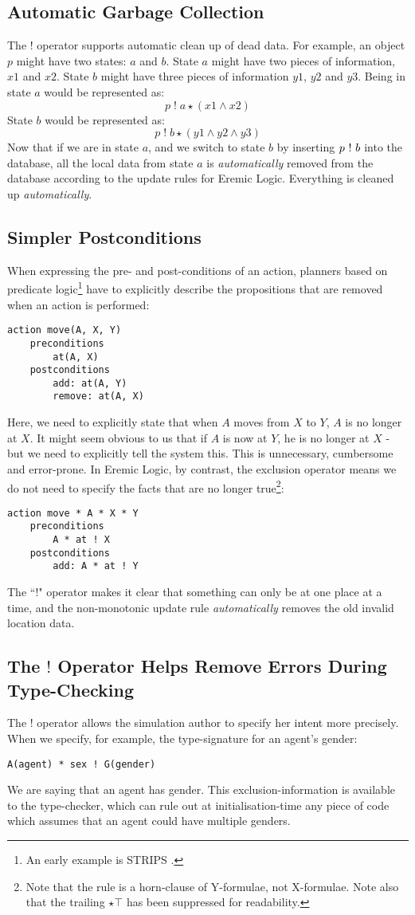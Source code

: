 \subsection{Automatic Garbage Collection}
The $!$ operator supports automatic clean up of dead data.
For example, an object $p$ might have two states: $a$ and $b$. State $a$ might have two pieces of information, $x1$ and $x2$. State $b$ might have three pieces of information $y1$, $y2$ and $y3$. Being in state $a$ would be represented as:
\[p \; ! \; a \star  (x1 \land x2)\]
State $b$ would be represented as:
\[p \; ! \; b \star (y1 \land y2 \land y3)\]
Now that if we are in state $a$, and we switch to state $b$ by inserting $p \ ! \  b$ into the database, all the local data from  state $a$ is \emph{automatically} removed from the database according to the update rules for Eremic Logic. Everything is cleaned up \emph{automatically}.

\subsection{Simpler Postconditions}
When expressing the pre- and post-conditions of an action, planners based on predicate logic\footnote{An early example is STRIPS \cite{strips}.} have to explicitly describe the propositions that are removed when an action is performed:
\begin{verbatim}
action move(A, X, Y)
    preconditions
        at(A, X)
    postconditions
        add: at(A, Y) 
        remove: at(A, X)
\end{verbatim}
Here, we need to explicitly state that when $A$ moves from $X$ to $Y$, $A$ is no longer at $X$. It might seem obvious to us that if $A$ is now at $Y$, he is no longer at $X$ - but we need to explicitly tell the system this. This is unnecessary, cumbersome and error-prone. In Eremic Logic, by contrast, the exclusion operator means we do not need to specify the facts that are no longer true\footnote{Note that the rule is a horn-clause of Y-formulae, not X-formulae. Note also that the trailing $\star \top$ has been suppressed for readability.}:
\begin{verbatim}
action move * A * X * Y
    preconditions
        A * at ! X
    postconditions
        add: A * at ! Y
\end{verbatim}
The ``!" operator makes it clear that something can only be at one place at a time, and the non-monotonic update rule \emph{automatically} removes the old invalid location data.

\subsection{The $!$ Operator Helps Remove Errors During Type-Checking}
The $!$ operator allows the simulation author to specify her intent more precisely.
When we specify, for example, the type-signature for an agent's gender:
\begin{verbatim}
A(agent) * sex ! G(gender)
\end{verbatim}
We are saying that an agent has  gender.
This exclusion-information is available to the type-checker, which can rule out at initialisation-time any piece of code which assumes that an agent could have multiple genders. 

